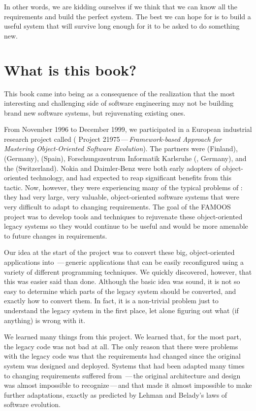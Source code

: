 \documentclass[a4paper,10pt,twoside]{book}
\begin{document}
In other words, we are kidding ourselves if we think that we can know all the requirements and build the perfect system. The best we can hope for is to build a useful system that will survive long enough for it to be asked to do something new. 

\section*{What is this book?}

This book came into being as a consequence of the realization that the most interesting and challenging side of software engineering may not be building brand new software systems, but rejuvenating existing ones.

From November 1996 to December 1999, we participated in a European industrial research project called  ( Project 21975\,---\,\emph{Framework-based Approach for Mastering Object-Oriented Software Evolution}). The partners were  (Finland),  (Germany),  (Spain), Forschungszentrum Informatik Karlsruhe (, Germany), and the  (Switzerland). Nokia and Daimler-Benz were both early adopters of object-oriented technology, and had expected to reap significant benefits from this tactic. Now, however, they were experiencing many of the typical problems of : they had very large, very valuable, object-oriented software systems that were very difficult to adapt to changing requirements. The goal of the FAMOOS project was to develop tools and techniques to rejuvenate these object-oriented legacy systems so they would continue to be useful and would be more amenable to future changes in requirements.

Our idea at the start of the project was to convert these big, object-oriented applications into \,---\,generic applications that can be easily reconfigured using a variety of different programming techniques. We quickly discovered, however, that this was easier said than done. Although the basic idea was sound, it is not so easy to determine which parts of the legacy system should be converted, and exactly how to convert them. In fact, it is a non-trivial problem just to understand the legacy system in the first place, let alone figuring out what (if anything) is wrong with it.

We learned many things from this project. We learned that, for the most part, the legacy code was not bad at all. The only reason that there were problems with the legacy code was that the requirements had changed since the original system was designed and deployed. Systems that had been adapted many times to changing requirements suffered from \,---\,the original architecture and design was almost impossible to recognize\,---\,and that made it almost impossible to make further adaptations, exactly as predicted by Lehman and Belady's laws of software evolution.
\end{document}
